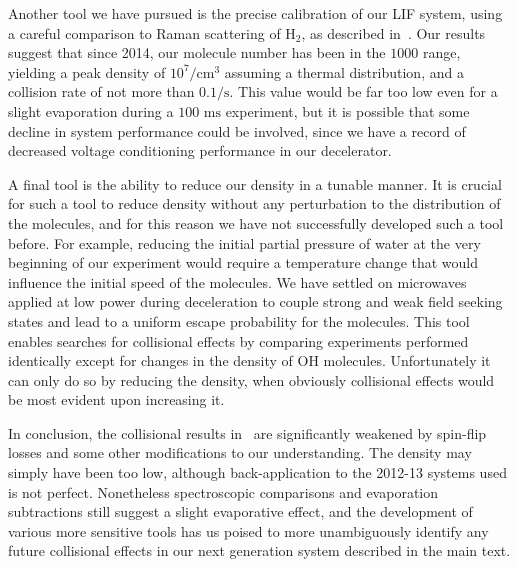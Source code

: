 \documentclass[%
 reprint,
 amsmath,amssymb,
 aps,
prl,
]{revtex4-1}
\begin{document}
Another tool we have pursued is the precise calibration of our LIF system, using a careful comparison to Raman scattering of $\text{H}_2$, as described in~\cite{Bischel1986}. Our results suggest that since 2014, our molecule number has been in the $1000$ range, yielding a peak density of $10^7/\text{cm}^3$ assuming a thermal distribution, and a collision rate of not more than $0.1/\text{s}$. This value would be far too low even for a slight evaporation during a $100\text{ ms}$ experiment, but it is possible that some decline in system performance could be involved, since we have a record of decreased voltage conditioning performance in our decelerator.

A final tool is the ability to reduce our density in a tunable manner. It is crucial for such a tool to reduce density without any perturbation to the distribution of the molecules, and for this reason we have not successfully developed such a tool before. For example, reducing the initial partial pressure of water at the very beginning of our experiment would require a temperature change that would influence the initial speed of the molecules. We have settled on microwaves applied at low power during deceleration to couple strong and weak field seeking states and lead to a uniform escape probability for the molecules. This tool enables searches for collisional effects by comparing experiments performed identically except for changes in the density of OH molecules. Unfortunately it can only do so by reducing the density, when obviously collisional effects would be most evident upon increasing it.

In conclusion, the collisional results in~\cite{Stuhl2012evap,Stuhl2013} are significantly weakened by spin-flip losses and some other modifications to our understanding. The density may simply have been too low, although back-application to the 2012-13 systems used is not perfect. Nonetheless spectroscopic comparisons and evaporation subtractions still suggest a slight evaporative effect, and the development of various more sensitive tools has us poised to more unambiguously identify any future collisional effects in our next generation system described in the main text.



\end{document}
